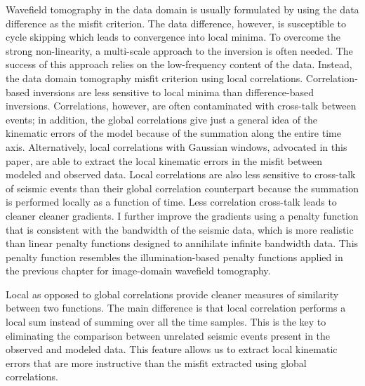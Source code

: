 Wavefield tomography in the data domain is usually formulated by using the
data difference as the misfit criterion. The data difference, however, is 
susceptible to cycle skipping which leads to convergence into local minima. To
overcome the strong non-linearity, a multi-scale approach to the inversion is
often needed. The success of this approach relies on the low-frequency content
of the data. Instead, the data domain tomography misfit criterion
using local correlations. Correlation-based inversions are less
sensitive to local minima than difference-based inversions. Correlations,
however, are often contaminated with cross-talk between events; in addition,
the global correlations give just a general idea of the kinematic errors of
the model because of the summation along the entire time axis. Alternatively, local
correlations with Gaussian windows, advocated in this paper, are able to
extract the local kinematic errors in the misfit between modeled and observed
data. Local correlations are also less sensitive to cross-talk of seismic events
than their global correlation counterpart because the summation is performed
locally as a function of time. Less correlation cross-talk leads to cleaner
cleaner gradients. I further improve the gradients
using a penalty function that is consistent with the bandwidth of the seismic
data, which is more realistic than linear penalty functions designed to annihilate
infinite bandwidth data. This penalty function resembles the illumination-based
penalty functions applied in the previous chapter for image-domain wavefield tomography.

Local as opposed to global correlations provide cleaner measures of similarity between two functions.
The main difference is that local correlation performs a local sum instead of summing 
over all the time samples. This is the key to eliminating the comparison between
 unrelated seismic events present in the observed and modeled data. This feature 
allows us to extract local kinematic errors that are 
more instructive than the misfit extracted using global correlations.

